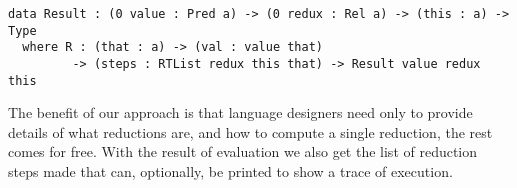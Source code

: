\begin{Verbatim}
data Result : (0 value : Pred a) -> (0 redux : Rel a) -> (this : a) -> Type
  where R : (that : a) -> (val : value that)
         -> (steps : RTList redux this that) -> Result value redux this
\end{Verbatim}

The benefit of our approach is that language designers need only to provide details of what reductions are, and how to compute a single reduction, the rest comes for free.
With the result of evaluation we also get the list of reduction steps made that can, optionally, be printed to show a trace of execution.

